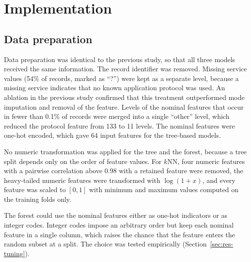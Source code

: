\documentclass[conference,10pt]{IEEEtran}
\begin{document}
\section{Implementation}\label{sec:impl}

\subsection{Data preparation}
Data preparation was identical to the previous study, so that all three models received the same information. The record identifier was removed. Missing service values (54\% of records, marked as ``?'') were kept as a separate level, because a missing service indicates that no known application protocol was used. An ablation in the previous study confirmed that this treatment outperformed mode imputation and removal of the feature. Levels of the nominal features that occur in fewer than 0.1\% of records were merged into a single ``other'' level, which reduced the protocol feature from 133 to 11 levels. The nominal features were one-hot encoded, which gave 64 input features for the tree-based models.

No numeric transformation was applied for the tree and the forest, because a tree split depends only on the order of feature values. For $k$NN, four numeric features with a pairwise correlation above 0.98 with a retained feature were removed, the heavy-tailed numeric features were transformed with $\log(1+x)$, and every feature was scaled to $[0,1]$ with minimum and maximum values computed on the training folds only.

The forest could use the nominal features either as one-hot indicators or as integer codes. Integer codes impose an arbitrary order but keep each nominal feature in a single column, which raises the chance that the feature enters the random subset at a split. The choice was tested empirically (Section~\ref{sec:res-tuning}).
\end{document}
